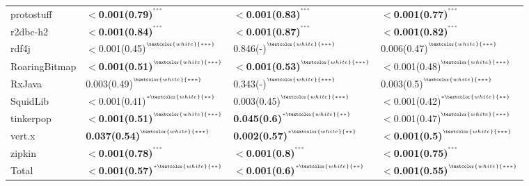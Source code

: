 \begin{tabular}{llll}
protostuff          &  \textbf{$<$0.001(0.79)}\tiny{$^{^{***}}$} &  \textbf{$<$0.001(0.83)}\tiny{$^{^{***}}$} &  \textbf{$<$0.001(0.77)}\tiny{$^{^{***}}$} \\
r2dbc-h2            &  \textbf{$<$0.001(0.84)}\tiny{$^{^{***}}$} &  \textbf{$<$0.001(0.87)}\tiny{$^{^{***}}$} &  \textbf{$<$0.001(0.82)}\tiny{$^{^{***}}$} \\
rdf4j               &  $<$0.001(0.45)\tiny{$^{^{\textcolor{white}{***}}}$} &  0.846(-)\tiny{$^{^{\textcolor{white}{***}}}$} &  0.006(0.47)\tiny{$^{^{\textcolor{white}{***}}}$} \\
RoaringBitmap       &  \textbf{$<$0.001(0.51)}\tiny{$^{^{\textcolor{white}{***}}}$} &  \textbf{$<$0.001(0.53)}\tiny{$^{^{\textcolor{white}{***}}}$} &  $<$0.001(0.48)\tiny{$^{^{\textcolor{white}{***}}}$} \\
RxJava              &  0.003(0.49)\tiny{$^{^{\textcolor{white}{***}}}$} &  0.343(-)\tiny{$^{^{\textcolor{white}{***}}}$} &  0.003(0.5)\tiny{$^{^{\textcolor{white}{***}}}$} \\
SquidLib            &  $<$0.001(0.41)\tiny{$^{^{*\textcolor{white}{**}}}$} &  0.003(0.45)\tiny{$^{^{\textcolor{white}{***}}}$} &  $<$0.001(0.42)\tiny{$^{^{*\textcolor{white}{**}}}$} \\
tinkerpop           &  \textbf{$<$0.001(0.51)}\tiny{$^{^{\textcolor{white}{***}}}$} &  \textbf{0.045(0.6)}\tiny{$^{^{*\textcolor{white}{**}}}$} &  $<$0.001(0.47)\tiny{$^{^{\textcolor{white}{***}}}$} \\
vert.x              &  \textbf{0.037(0.54)}\tiny{$^{^{\textcolor{white}{***}}}$} &  \textbf{0.002(0.57)}\tiny{$^{^{*\textcolor{white}{**}}}$} &  \textbf{$<$0.001(0.5)}\tiny{$^{^{\textcolor{white}{***}}}$} \\
zipkin              &  \textbf{$<$0.001(0.78)}\tiny{$^{^{***}}$} &  \textbf{$<$0.001(0.8)}\tiny{$^{^{***}}$} &  \textbf{$<$0.001(0.75)}\tiny{$^{^{***}}$} \\
Total               &  \textbf{$<$0.001(0.57)}\tiny{$^{^{*\textcolor{white}{**}}}$} &  \textbf{$<$0.001(0.6)}\tiny{$^{^{*\textcolor{white}{**}}}$} &  \textbf{$<$0.001(0.55)}\tiny{$^{^{\textcolor{white}{***}}}$} \\
\bottomrule
\end{tabular}

